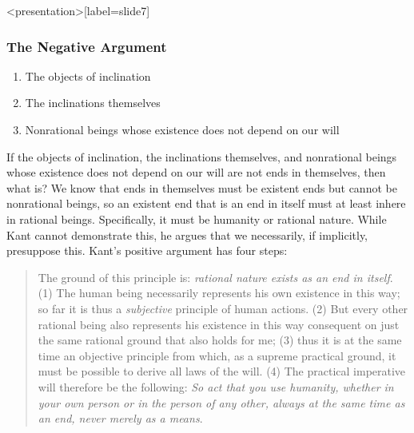 \begin{frame}<presentation>[label=slide7]
    \frametitle{The Negative Argument}
        \begin{enumerate}
            \item<1-> The objects of inclination
            \item<2-> The inclinations themselves
            \item<3-> Nonrational beings whose existence does not depend on our will
        \end{enumerate}
\end{frame}

If the objects of inclination, the inclinations themselves, and nonrational beings whose existence does not depend on our will are not ends in themselves, then what is? We know that ends in themselves must be existent ends but cannot be nonrational beings, so an existent end that is an end in itself must at least inhere in rational beings. Specifically, it must be humanity or rational nature. While Kant cannot demonstrate this, he argues that we necessarily, if implicitly, presuppose this. Kant’s positive argument has four steps:

\begin{quote}
	The ground of this principle is: \emph{rational nature exists as an end in itself}. (1) The human being necessarily represents his own existence in this way; so far it is thus a \emph{subjective} principle of human actions. (2) But every other rational being also represents his existence in this way consequent on just the same rational ground that also holds for me; (3) thus it is at the same time an objective principle from which, as a supreme practical ground, it must be possible to derive all laws of the will. (4) The practical imperative will therefore be the following: \emph{So act that you use humanity, whether in your own person or in the person of any other, always at the same time as an end, never merely as a means}.
\end{quote}

